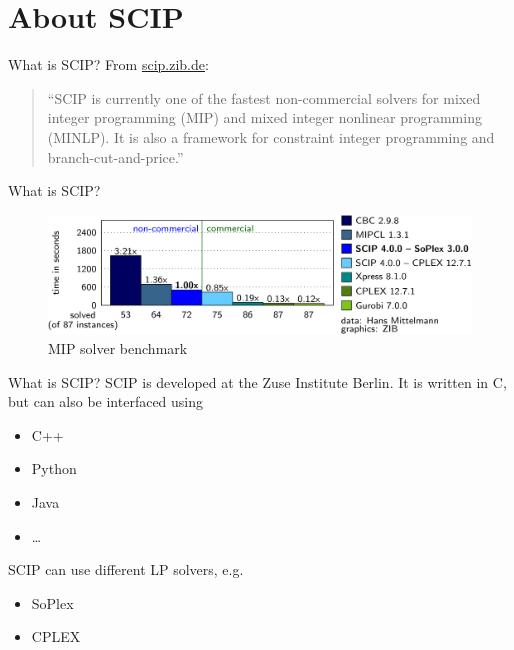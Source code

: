 \documentclass[fleqn]{beamer}
\begin{document}
	\section{About SCIP}
	\begin{frame}{What is SCIP?}
		From \url{scip.zib.de}:
		\begin{quote}
			``SCIP is currently one of the fastest non-commercial solvers for mixed integer programming (MIP)
			and mixed integer nonlinear programming (MINLP).
			It is also a framework for constraint integer programming and branch-cut-and-price.''
		\end{quote}
	\end{frame}

    \begin{frame}{What is SCIP?}
        \begin{figure}
            \includegraphics{comparison}
            \caption{MIP solver benchmark}
        \end{figure}
    \end{frame}

    \begin{frame}{What is SCIP?}
        SCIP is developed at the Zuse Institute Berlin.
        It is written in C, but can also be interfaced using
        \begin{itemize}
            \item C++
            \item Python
            \item Java
            \item \dots
        \end{itemize}
    
        SCIP can use different LP solvers, e.g.
        \begin{itemize}
            \item SoPlex %
            \item CPLEX
        \end{itemize}
    \end{frame}
\end{document}
